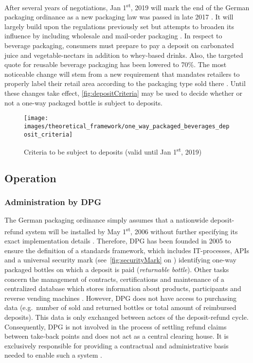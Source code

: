 After several years of negotiations, Jan 1\textsuperscript{st}, 2019 will mark the end of the German packaging ordinance as a new packaging law was passed in late 2017 \cite[p.~4]{verpackG}. It will largely build upon the regulations previously set but attempts to broaden its influence by including wholesale and mail-order packaging \cite[p.~6]{verpackG}. In respect to beverage packaging, consumers must prepare to pay a deposit on carbonated juice and vegetable-nectars in addition to whey-based drinks. Also, the targeted quote for reusable beverage packaging has been lowered to 70\%. The most noticeable change will stem from a new requirement that mandates retailers to properly label their retail area according to the packaging type sold there \cite[p.~9]{verpackG}. Until these changes take effect, \autoref{fig:depositCriteria} may be used to decide whether or not a one-way packaged bottle is subject to deposits.

\begin{figure}[hbt]
	\centering
	\texttt{[image: images/theoretical\_framework/one\_way\_packaged\_beverages\_deposit\_criteria]}
	\caption[Criteria to be considered for deposits (valid until Jan 1\textsuperscript{st}, 2019)]{Criteria to be subject to deposits (valid until Jan 1\textsuperscript{st}, 2019) \cite[p.~9]{Hartlep2011Recycling}}
	\label{fig:depositCriteria}
\end{figure}

\FloatBarrier

\subsection{Operation}

\subsubsection{Administration by \acl{DPG}}
\label{sec:DPGAdministration}
The German packaging ordinance simply assumes that a nationwide deposit-refund system will be installed by May 1\textsuperscript{st}, 2006 without further specifying its exact implementation details \cite[Art.~2]{verpackV2005} \cite[§~9]{verpackV2008}. Therefore, \ac{DPG} has been founded in 2005 to ensure the definition of a standards framework, which includes IT-processes, APIs and a universal security mark (see~\autoref{fig:securityMark} on ) identifying one-way packaged bottles on which a deposit is paid (\textit{returnable bottle}). Other tasks concern the management of contracts, certifications and maintenance of a centralized database which stores information about products, participants and reverse vending machines \cite[pp.~13]{Hartlep2011Recycling}. However, \ac{DPG} does not have access to purchasing data (e.g.~number of sold and returned bottles or total amount of reimbursed deposits). This data is only exchanged between actors of the deposit-refund cycle. Consequently, \ac{DPG} is not involved in the process of settling refund claims between take-back points and does not act as a central clearing house. It is exclusively responsible for providing a contractual and administrative basis needed to enable such a system \cite[p.~14]{Hartlep2011Recycling}.

